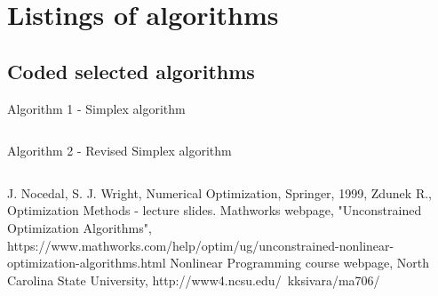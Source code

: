 \documentclass[eng,openany]{mgr}
\begin{document}
\clearpage
\chapter{Listings of algorithms}
\section{Coded selected algorithms}
Algorithm 1 - Simplex algorithm\\ 
\begin{lstlisting}

\end{lstlisting}
\newpage
Algorithm 2 - Revised Simplex algorithm\\
\begin{lstlisting}

\end{lstlisting}
\begin{thebibliography}{8}
J. Nocedal, S. J. Wright, Numerical Optimization, Springer, 1999,
Zdunek R., Optimization Methods - lecture slides.
Mathworks webpage, "Unconstrained Optimization Algorithms", https://www.mathworks.com/help/optim/ug/unconstrained-nonlinear-optimization-algorithms.html
Nonlinear Programming course webpage, North Carolina State University,
http://www4.ncsu.edu/~kksivara/ma706/
\end{thebibliography}
\end{document}
